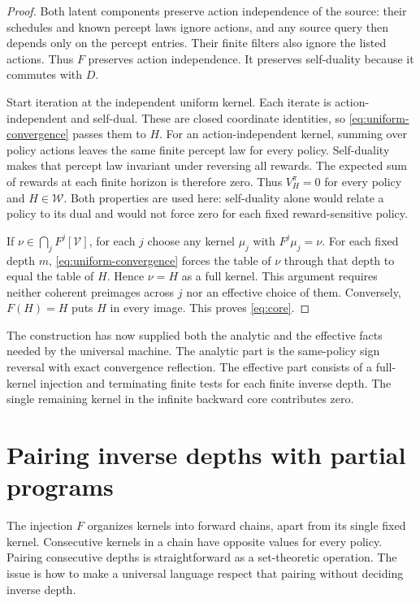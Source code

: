 \documentclass[11pt]{article}
\theoremstyle{definition}
\theoremstyle{remark}
\newcommand{\V}{\mathcal V}
\newcommand{\W}{\mathcal W}
\begin{document}
\begin{proof}
Both latent components preserve action independence of the source:
their schedules and known percept laws ignore actions, and any source
query then depends only on the percept entries.  Their finite filters
also ignore the listed actions.  Thus $F$ preserves action independence.
It preserves self-duality because it commutes with $D$.

Start iteration at the independent uniform kernel.  Each iterate is
action-independent and self-dual.  These are closed coordinate
identities, so \eqref{eq:uniform-convergence} passes them to $H$.
For an action-independent kernel, summing over policy actions leaves
the same finite percept law for every policy.  Self-duality makes
that percept law invariant under reversing all rewards.  The expected
sum of rewards at each finite horizon is therefore zero.  Thus
$V_H^\pi=0$ for every policy and $H\in\W$.  Both properties are
used here: self-duality alone would relate a policy to its dual and
would not force zero for each fixed reward-sensitive policy.

If $\nu\in\bigcap_jF^j[\V]$, for each $j$ choose any kernel
$\mu_j$ with $F^j\mu_j=\nu$.  For each fixed depth $m$,
\eqref{eq:uniform-convergence} forces the table of $\nu$ through
that depth to equal the table of $H$.  Hence $\nu=H$ as a full
kernel.  This argument requires neither coherent preimages across
$j$ nor an effective choice of them.  Conversely, $F(H)=H$ puts
$H$ in every image.  This proves \eqref{eq:core}.
\end{proof}

The construction has now supplied both the analytic and the effective
facts needed by the universal machine.  The analytic part is the
same-policy sign reversal with exact convergence reflection.  The
effective part consists of a full-kernel injection and terminating
finite tests for each finite inverse depth.  The single remaining
kernel in the infinite backward core contributes zero.

\section{Pairing inverse depths with partial programs}
\label{sec:parity}

The injection $F$ organizes kernels into forward chains, apart from its
single fixed kernel.  Consecutive kernels in a chain have opposite
values for every policy.  Pairing consecutive depths is straightforward
as a set-theoretic operation.  The issue is how to make a universal
language respect that pairing without deciding inverse depth.
\end{document}
